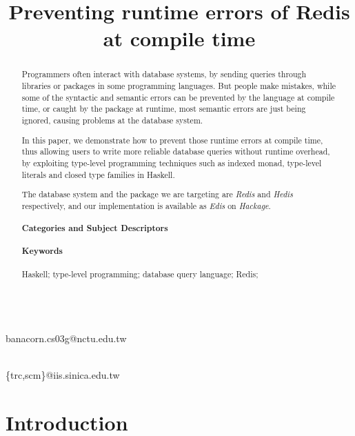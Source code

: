 \documentclass[pldi]{sigplanconf-pldi16}
\begin{document}
\title{Preventing runtime errors of Redis at compile time}

%
%

{ \\
}
{banacorn.cs03g@nctu.edu.tw}

{ \\
}
{\{trc,scm\}@iis.sinica.edu.tw}

\maketitle

\begin{abstract}
Programmers often interact with database systems, by sending queries through
 libraries or packages in some programming languages. But people make mistakes,
 while some of the syntactic and semantic errors can be prevented by the
 language at compile time, or caught by the package at runtime, most semantic
 errors are just being ignored, causing problems at the database system.

In this paper, we demonstrate how to prevent those runtime errors at compile
 time, thus allowing users to write more reliable database queries without
 runtime overhead, by exploiting type-level programming techniques such as
 indexed monad, type-level literals and closed type families in Haskell.

The database system and the package we are targeting are \emph{Redis} and
 \emph{Hedis} respectively, and our implementation is available as \emph{Edis}
 on \emph{Hackage}.

\paragraph{Categories and Subject Descriptors}
\paragraph{Keywords}
Haskell; type-level programming; database query language; Redis;
\end{abstract}

\section{Introduction}
\end{document}
